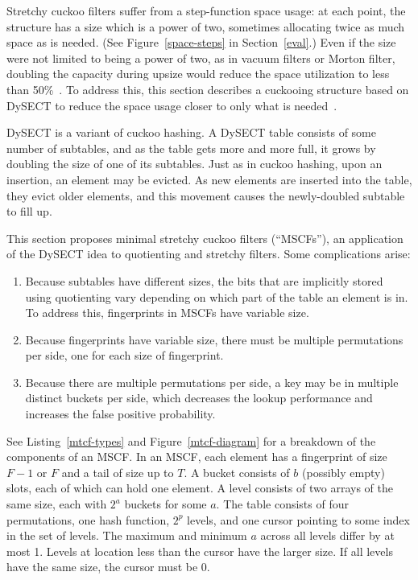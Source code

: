 \documentclass[letterpaper,twocolumn,10pt]{article}
\newcommand{\taffy}{stretchy}
\newcommand{\Taffy}{Stretchy}
\newcommand{\MTCF}{MSCF}
\newcommand{\taffy}{taffy}
\newcommand{\Taffy}{Taffy}
\newcommand{\MTCF}{MTCF}
\begin{document}
\Taffy{} cuckoo filters suffer from a step-function space usage:
at each point, the structure has a size which is a power of two, sometimes allocating twice as much space as is needed. (See Figure~\ref{space-steps} in Section~\ref{eval}.)
Even if the size were not limited to being a power of two, as in vacuum filters or Morton filter, doubling the capacity during upsize would reduce the space utilization to less than 50\%~\cite{vacuum, morton-journal}.
To address this, this section describes a cuckooing structure based on DySECT to reduce the space usage closer to only what is needed~\cite{dysect}.

DySECT is a variant of cuckoo hashing.
A DySECT table consists of some number of subtables, and as the table gets more and more full, it grows by doubling the size of one of its subtables.
Just as in cuckoo hashing, upon an insertion, an element may be evicted.
As new elements are inserted into the table, they evict older elements, and this movement causes the newly-doubled subtable to fill up.

This section proposes minimal \taffy{} cuckoo filters (``\MTCF{}s''), an application of the DySECT idea to quotienting and \taffy{} filters.
Some complications arise:

\begin{enumerate}
  \item Because subtables have different sizes, the bits that are implicitly stored using quotienting vary depending on which part of the table an element is in.
    To address this, fingerprints in \MTCF{}s have variable size.
  \item Because fingerprints have variable size, there must be multiple permutations per side, one for each size of fingerprint.
  \item Because there are multiple permutations per side, a key may be in multiple distinct buckets per side, which decreases the lookup performance and increases the false positive probability.
\end{enumerate}

See Listing~\ref{mtcf-types} and Figure~\ref{mtcf-diagram} for a breakdown of the components of an \MTCF{}.
In an \MTCF{}, each element has a fingerprint of size $F-1$ or $F$ and a tail of size up to $T$.
A bucket consists of $b$ (possibly empty) slots, each of which can hold one element.
A level consists of two arrays of the same size, each with $2^a$ buckets for some $a$.
The table consists of four permutations, one hash function, $2^p$ levels, and one cursor pointing to some index in the set of levels.
The maximum and minimum $a$ across all levels differ by at most 1.
Levels at location less than the cursor have the larger size.
If all levels have the same size, the cursor must be 0.
\end{document}
